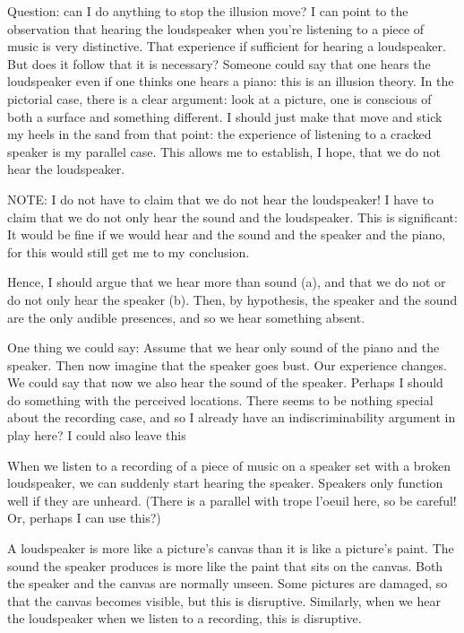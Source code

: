 \documentclass[sloppy, journal, git, bytitle, dodraft]{humapap}
\begin{document}
Question: can I do anything to stop the illusion move? I can point to the observation that hearing the loudspeaker when you're listening to a piece of music is very distinctive. That experience if sufficient for hearing a loudspeaker. But does it follow that it is necessary? Someone could say that one hears the loudspeaker even if one thinks one hears a piano: this is an illusion theory. In the pictorial case, there is a clear argument: look at a picture, one is conscious of both a surface and something different. I should just make that move and stick my heels in the sand from that point: the experience of listening to a cracked speaker is my parallel case. This allows me to establish, I hope, that we do not hear the loudspeaker. 

NOTE: I do not have to claim that we do not hear the loudspeaker! I have to claim that we do not only hear the sound and the loudspeaker. This is significant: It would be fine if we would hear and the sound and the speaker and the piano, for this would still get me to my conclusion. 

Hence, I should argue that we hear more than sound (a), and that we do not or do not only hear the speaker (b). Then, by hypothesis, the speaker and the sound are the only audible presences, and so we hear something absent. 

One thing we could say: Assume that we hear only sound of the piano and the speaker. Then now imagine that the speaker goes bust. Our experience changes. We could say that now we also hear the sound of the speaker. Perhaps I should do something with the perceived locations. There seems to be nothing special about the recording case, and so I already have an indiscriminability argument in play here? I could also leave this 

When we listen to a recording of a piece of music on a speaker set with a broken loudspeaker, we can suddenly start hearing the speaker. Speakers only function well if they are unheard. (There is a parallel with trope l'oeuil here, so be careful! Or, perhaps I can use this?) 

A loudspeaker is more like a picture's canvas than it is like a picture's paint. The sound the speaker produces is more like the paint that sits on the canvas. Both the speaker and the canvas are normally unseen. Some pictures are damaged, so that the canvas becomes visible, but this is disruptive. Similarly, when we hear the loudspeaker when we listen to a recording, this is disruptive. 
\end{document}
